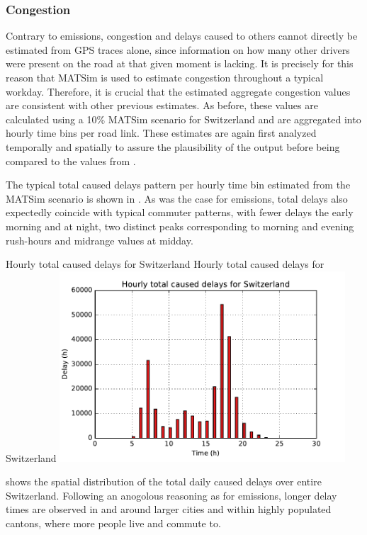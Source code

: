 \subsubsection{Congestion}

Contrary to emissions, congestion and delays caused to others cannot directly be estimated from GPS traces alone, since information on how many other drivers were present on the road at that given moment is lacking.
It is precisely for this reason that MATSim is used to estimate congestion throughout a typical workday.
Therefore, it is crucial that the estimated aggregate congestion values are consistent with other previous estimates.
As before, these values are calculated using a 10\% MATSim scenario for Switzerland and are aggregated into hourly time bins per road link.
These estimates are again first analyzed temporally and spatially to assure the plausibility of the output before being compared to the values from \citet{mkinfras2016staukosten}.

The typical total caused delays pattern per hourly time bin estimated from the MATSim scenario is shown in .
As was the case for emissions, total delays also expectedly coincide with typical commuter patterns, with fewer delays the early morning and at night, two distinct peaks corresponding to morning and evening rush-hours and midrange values at midday.

\createfigure%
{Hourly total caused delays for Switzerland}%
{Hourly total caused delays for Switzerland}%
{\label{fig:hourlyDelays}}%
{\includegraphics[width=0.8\textwidth,
angle=0]{figures/hourly_caused_delays.pdf}}%
{}

 shows the spatial distribution of the total daily caused delays over entire Switzerland.
Following an anogolous reasoning as for emissions, longer delay times are observed in and around larger cities and within highly populated cantons, where more people live and commute to.

